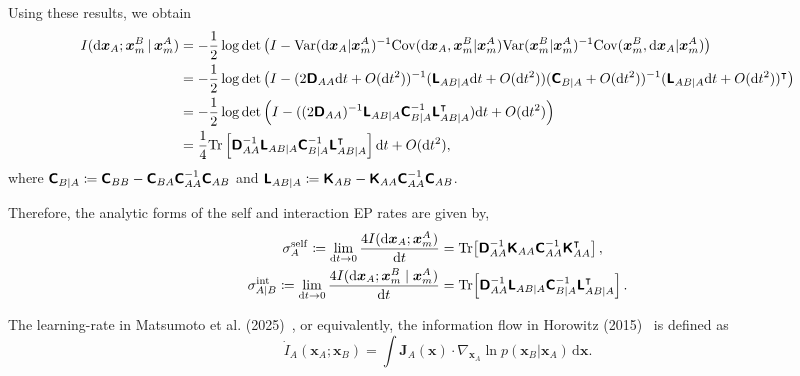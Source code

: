 Using these results, we obtain
\begin{equation*}
\begin{aligned}
    I(\mathrm{d}\bm{x}_A;\bm{x}_m^B\,|\,\bm{x}_m^A)
    &=-\frac{1}{2}\log\det\left(
    I-\mathrm{Var}(\mathrm{d}\bm{x}_A|\bm{x}_m^A)^{-1}
    \mathrm{Cov}(\mathrm{d}\bm{x}_A, \bm{x}_m^B|\bm{x}_m^A)
    \mathrm{Var}(\bm{x}_m^B|\bm{x}_m^A)^{-1}
    \mathrm{Cov}(\bm{x}_m^B,\mathrm{d}\bm{x}_A|\bm{x}_m^A)
    \right)\\
    &=-\frac{1}{2}\log\det\left(I-
    (2\boldsymbol{\mathsf{D}}_{AA}\mathrm{d}t+O(\mathrm{d}t^2))^{-1}
    (\boldsymbol{\mathsf{L}}_{AB|A}\mathrm{d}t+O(\mathrm{d}t^2))
    (\boldsymbol{\mathsf{C}}_{B|A}+O(\mathrm{d}t^2))^{-1}
    (\boldsymbol{\mathsf{L}}_{AB|A}\mathrm{d}t+O(\mathrm{d}t^2))^\intercal
    \right)\\
    &=-\frac{1}{2}\log\det\left(
    I-((2\boldsymbol{\mathsf{D}}_{AA})^{-1}
    \boldsymbol{\mathsf{L}}_{AB|A}\boldsymbol{\mathsf{C}}_{B|A}^{-1}
    \boldsymbol{\mathsf{L}}_{AB|A}^\intercal)\mathrm{d}t
    +O(\mathrm{d}t^2)\right)\\
    &=\frac{1}{4}\mathrm{Tr}\left[
    \boldsymbol{\mathsf{D}}_{AA}^{-1}\boldsymbol{\mathsf{L}}_{AB|A}
    \boldsymbol{\mathsf{C}}_{B|A}^{-1}\boldsymbol{\mathsf{L}}_{AB|A}^\intercal
    \right]\mathrm{d}t+O(\mathrm{d}t^2),
\end{aligned}
\end{equation*}
where $\boldsymbol{\mathsf{C}}_{B|A}\coloneq\boldsymbol{\mathsf{C}}_{BB}-\boldsymbol{\mathsf{C}}_{BA}\boldsymbol{\mathsf{C}}_{AA}^{-1}\boldsymbol{\mathsf{C}}_{AB}$ and $\boldsymbol{\mathsf{L}}_{AB|A}\coloneq\boldsymbol{\mathsf{K}}_{AB}-\boldsymbol{\mathsf{K}}_{AA}\boldsymbol{\mathsf{C}}_{AA}^{-1}\boldsymbol{\mathsf{C}}_{AB}$.

Therefore, the analytic forms of the self and interaction EP rates are given by,
\begin{align}
    \sigma_A^{\mathrm{self}}\coloneq\lim_{\mathrm{d}t\rightarrow0}
    \frac{4I(\mathrm{d}\bm x_A;\bm x_m^A)}{\mathrm{d}t}
    &=\mathrm{Tr}\!\left[
    \boldsymbol{\mathsf{D}}_{AA}^{-1}\boldsymbol{\mathsf{K}}_{AA}
    \boldsymbol{\mathsf{C}}_{AA}^{-1}\boldsymbol{\mathsf{K}}_{AA}^\intercal\right],
    \label{seq:cal_self_EP_linear}
    \\
    \sigma_{A|B}^{\mathrm{int}}\coloneq\lim_{\mathrm{d}t\rightarrow0}
    \frac{4I(\mathrm{d}\bm x_A;\bm x_m^B\mid\bm x_m^A)}{\mathrm{d}t}
    &=\mathrm{Tr}\!\left[
    \boldsymbol{\mathsf{D}}_{AA}^{-1}\boldsymbol{\mathsf{L}}_{AB|A}
    \boldsymbol{\mathsf{C}}_{B|A}^{-1}\boldsymbol{\mathsf{L}}_{AB|A}^\intercal
    \right].
    \label{seq:cal_int_EP_linear}
\end{align}

The learning-rate in Matsumoto et al. (2025)~\cite{matsumoto2025learningrate}, or equivalently, the information flow in Horowitz (2015)~\cite{horowitz2015multipartite} is defined as
\[
    \dot I_A(\bm x_A;\bm x_B)
    =\int\bm J_A(\bm x)\cdot
    \nabla_{\bm x_A}\ln p(\bm x_B|\bm x_A)\,\mathrm d\bm x.
\]

